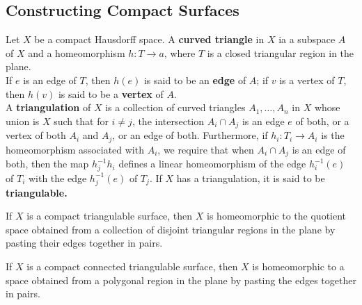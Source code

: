 \subsection{Constructing Compact Surfaces}

\begin{definition}
Let $X$ be a compact Hausdorff space. A \textbf{curved triangle} in $X$ ia a subspace $A$ of $X$ and a homeomorphism $h \colon T \rightarrow a$, 
where $T$ is a closed triangular region in the plane. \\

If $e$ is an edge of $T$, then $h(e)$ is said to be an \textbf{edge} of $A$; if $v$ is a vertex of $T$, then $h(v)$ is said to be a \textbf{vertex} of $A$. \\

A \textbf{triangulation} of $X$ is a collection of curved triangles $A_1, \dots, A_n$ in $X$ whose union is $X$ such that for $i \neq j$, 
the intersection $A_i \cap A_j$ is an edge $e$ of both, or a vertex of both $A_i$ and $A_j$, or an edge of both. Furthermore, if $h_i \colon T_i \rightarrow A_i$ is the
homeomorphism associated with $A_i$, we require that when $A_i \cap A_j$ is an edge of both, then the map $h_j^{-1}h_i$ defines a linear homeomorphism
of the edge $h_i^{-1}(e)$ of $T_i$ with the edge $h_j^{-1}(e)$ of $T_j$. If $X$ has a triangulation, it is said to be \textbf{triangulable.}
\end{definition}

\begin{theorem}
If $X$ is a compact triangulable surface, then $X$ is homeomorphic to the quotient space obtained from a collection of disjoint triangular regions in the plane
by pasting their edges together in pairs.
\end{theorem}

\begin{theorem}
If $X$ is a compact connected triangulable surface, then $X$ is homeomorphic to a space obtained from a polygonal region in the plane by pasting the edges together in pairs.
\end{theorem}